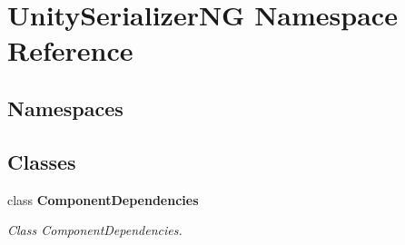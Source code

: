 \hypertarget{namespace_unity_serializer_n_g}{}\section{Unity\+Serializer\+NG Namespace Reference}
\label{namespace_unity_serializer_n_g}
\subsection*{Namespaces}
\begin{DoxyCompactItemize}
\end{DoxyCompactItemize}
\subsection*{Classes}
\begin{DoxyCompactItemize}
\item 
class {\bfseries Component\+Dependencies}
\begin{DoxyCompactList}\small\item\em Class Component\+Dependencies. \end{DoxyCompactList}\end{DoxyCompactItemize}

